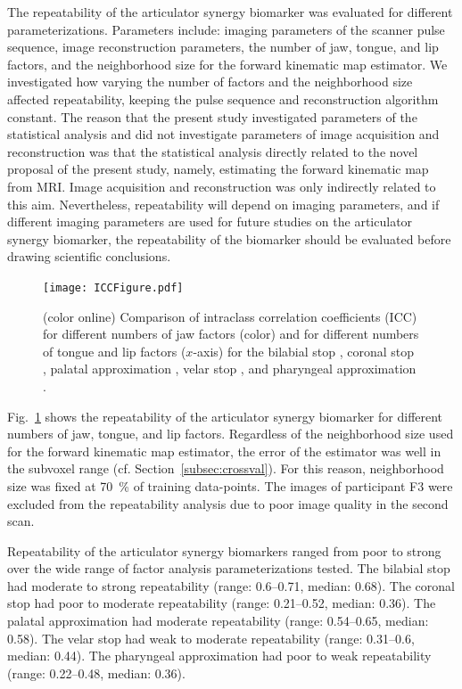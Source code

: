 \documentclass[preprint]{JASAnew}\usepackage[]{graphicx}\usepackage[]{color}
\begin{document}
The repeatability of the articulator synergy biomarker was evaluated for different parameterizations. 
%
Parameters include: imaging parameters of the scanner pulse sequence, image reconstruction parameters, the number of jaw, tongue, and lip factors, and the neighborhood size for the forward kinematic map estimator.
%
We investigated how varying the number of factors and the neighborhood size affected repeatability, keeping the pulse sequence and reconstruction algorithm constant. 
%
The reason that the present study investigated parameters of the statistical analysis and did not investigate parameters of image acquisition and reconstruction was that the statistical analysis directly related to the novel proposal of the present study, namely, estimating the forward kinematic map from MRI. Image acquisition and reconstruction was only indirectly related to this aim. 
%
Nevertheless, repeatability will depend on imaging parameters, and if different imaging parameters are used for future studies on the articulator synergy biomarker, the repeatability of the biomarker should be evaluated before drawing scientific conclusions. 


\begin{figure}[t]
\raggedright
\texttt{[image: ICCFigure.pdf]}

\caption{(color online) Comparison of intraclass correlation coefficients (ICC) for different numbers of jaw factors (color) and for different numbers of tongue and lip factors ($x$-axis) for the bilabial stop \textipa{[p]}, coronal stop \textipa{[t]}, palatal approximation \textipa{[i]}, velar stop \textipa{[k]}, and pharyngeal approximation \textipa{[A]}.}
\label{fig:icc_all}

\end{figure}


Fig.~\ref{fig:icc_all} shows the repeatability of the articulator synergy biomarker for different numbers of jaw, tongue, and lip factors. 
%
Regardless of the neighborhood size used for the forward kinematic map estimator, the error of the estimator was well in the subvoxel range (cf. Section~\ref{subsec:crossval}). For this reason, neighborhood size was fixed at \SI{70}{\percent} of training data-points. 
%
The images of participant F3 were excluded from the repeatability analysis due to poor image quality in the second scan. 



Repeatability of the articulator synergy biomarkers ranged from poor to strong over the wide range of factor analysis parameterizations tested. 
%
%
The bilabial stop had
moderate  to  strong
repeatability
(range: \numrange{0.6}{0.71},
median: \num{0.68}). 
%
% 
The coronal stop had
poor  to  moderate
repeatability
(range: \numrange{0.21}{0.52},
median: \num{0.36}). 
%
%
The palatal approximation had
moderate
repeatability
(range: \numrange{0.54}{0.65},
median: \num{0.58}). 
%
%
The velar stop had
weak  to  moderate
repeatability
(range: \numrange{0.31}{0.6},
median: \num{0.44}). 
%
%
The pharyngeal approximation had 
poor  to  weak
repeatability
(range: \numrange{0.22}{0.48},
median: \num{0.36}). 
\end{document}
